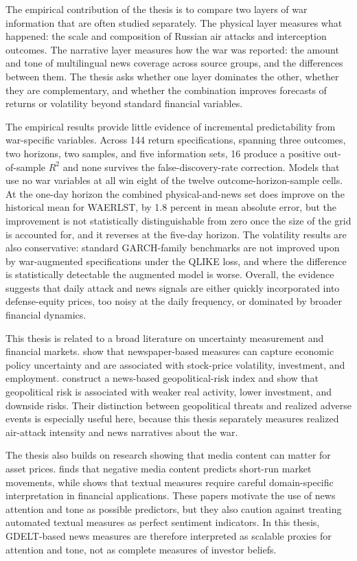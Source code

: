 \documentclass[12pt,a4paper]{article}
\begin{document}
The empirical contribution of the thesis is to compare two layers of war information that are often studied separately. The physical layer measures what happened: the scale and composition of Russian air attacks and interception outcomes. The narrative layer measures how the war was reported: the amount and tone of multilingual news coverage across source groups, and the differences between them. The thesis asks whether one layer dominates the other, whether they are complementary, and whether the combination improves forecasts of returns or volatility beyond standard financial variables.

The empirical results provide little evidence of incremental predictability from war-specific variables. Across 144 return specifications, spanning three outcomes, two horizons, two samples, and five information sets, 16 produce a positive out-of-sample $R^2$ and none survives the false-discovery-rate correction. Models that use no war variables at all win eight of the twelve outcome-horizon-sample cells. At the one-day horizon the combined physical-and-news set does improve on the historical mean for WAERLST, by 1.8 percent in mean absolute error, but the improvement is not statistically distinguishable from zero once the size of the grid is accounted for, and it reverses at the five-day horizon. The volatility results are also conservative: standard GARCH-family benchmarks are not improved upon by war-augmented specifications under the QLIKE loss, and where the difference is statistically detectable the augmented model is worse. Overall, the evidence suggests that daily attack and news signals are either quickly incorporated into defense-equity prices, too noisy at the daily frequency, or dominated by broader financial dynamics.

This thesis is related to a broad literature on uncertainty measurement and financial markets. \citet{baker2016epu} show that newspaper-based measures can capture economic policy uncertainty and are associated with stock-price volatility, investment, and employment. \citet{caldara2022gpr} construct a news-based geopolitical-risk index and show that geopolitical risk is associated with weaker real activity, lower investment, and downside risks. Their distinction between geopolitical threats and realized adverse events is especially useful here, because this thesis separately measures realized air-attack intensity and news narratives about the war.

The thesis also builds on research showing that media content can matter for asset prices. \citet{tetlock2007media} finds that negative media content predicts short-run market movements, while \citet{loughran2011textual} shows that textual measures require careful domain-specific interpretation in financial applications. These papers motivate the use of news attention and tone as possible predictors, but they also caution against treating automated textual measures as perfect sentiment indicators. In this thesis, GDELT-based news measures are therefore interpreted as scalable proxies for attention and tone, not as complete measures of investor beliefs.
\end{document}
